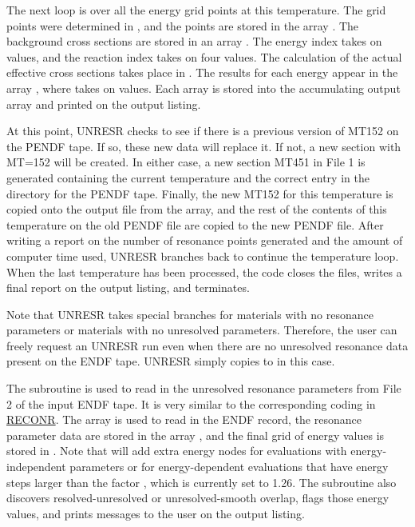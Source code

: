 The next loop is over all the energy grid points at this
temperature.  The grid points were determined in
, and the 
points are stored in the array .
The background cross sections are stored in an array
.  The energy index takes on  values,
and the reaction index  takes on four values.  The
calculation of the actual effective cross sections takes place
in .  The results for each energy appear in the
array , where  takes on
 values.  Each  array is stored
into the accumulating output array  and printed on
the output listing.

At this point, UNRESR checks to see if there is a previous
version of MT152 on the PENDF tape.  If so, these new
data will replace it.  If not, a new section with MT=152 will be
created.  In either case, a new section MT451 in File 1 is generated
containing the current temperature and the correct entry in
the directory for the PENDF tape.  Finally, the new MT152 for
this temperature is copied onto the output file from the
 array, and the rest of the contents of this temperature
on the old PENDF file are copied to the new PENDF file.
After writing a report on the number of resonance points generated
and the amount of computer time used, UNRESR branches back to
continue the temperature loop.  When the last temperature has
been processed, the code closes the files, writes a final report
on the output listing, and terminates.

Note that UNRESR takes special branches for materials with no
resonance parameters or materials with no unresolved parameters.
Therefore, the user can freely request an UNRESR run even when there
are no unresolved resonance data present on the ENDF tape.  UNRESR
simply copies  to  in this case.

The subroutine  is used
to read in the unresolved resonance parameters from File 2 of
the input ENDF tape.  It is very similar to the corresponding
coding in \hyperlink{sRECONRhy}{RECONR}.  The array
 is used to read in the
ENDF record, the resonance parameter data are stored in the
array , and the final grid of energy values is
stored in .  Note that  will add
extra energy nodes for evaluations with energy-independent
parameters or for energy-dependent evaluations that have energy
steps larger than the factor ,
which is currently set to 1.26.  The subroutine
also discovers resolved-unresolved or unresolved-smooth overlap,
flags those energy values, and prints messages to the user on
the output listing.

